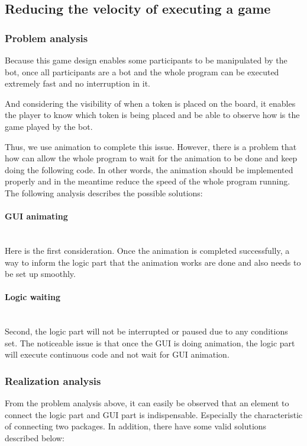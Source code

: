 \subsection{Reducing the velocity of executing a game}

\subsubsection{Problem analysis}

Because this game design enables some participants to be manipulated by the bot, once all participants are a bot and the whole program can be executed extremely fast and no interruption in it. 

And considering the visibility of when a token is placed on the board, it enables the player to know which token is being placed and be able to observe how is the game played by the bot. 

Thus, we use animation to complete this issue. However, there is a problem that how can allow the whole program to wait for the animation to be done and keep doing the following code. In other words, the animation should be implemented properly and in the meantime reduce the speed of the whole program running. The following analysis describes the possible solutions:

\paragraph{GUI animating} \mbox{}\\
Here is the first consideration. Once the animation is completed successfully, a way to inform the logic part that the animation works are done and also needs to be set up smoothly. 


\paragraph{Logic waiting} \mbox{}\\
Second, the logic part will not be interrupted or paused due to any conditions set. The noticeable issue is that once the GUI is doing animation, the logic part will execute continuous code and not wait for GUI animation.

\subsubsection{Realization analysis}
From the problem analysis above, it can easily be observed that an element to connect the logic part and GUI part is indispensable. Especially the characteristic of connecting two packages. In addition, there have some valid solutions described below: 

